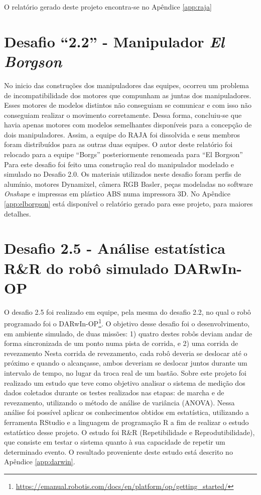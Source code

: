 O relatório gerado deste projeto encontra-se no Apêndice \ref{app:raja}


\section{Desafio ``2.2'' - Manipulador \textit{El Borgson}}

No inicio das construções dos manipuladores das equipes, ocorreu um problema de incompatibilidade dos motores que compunham as juntas dos manipuladores. Esses motores de modelos distintos não conseguiam se comunicar e com isso não conseguiam realizar o movimento corretamente. Dessa forma, concluiu-se que havia apenas motores com modelos semelhantes disponíveis para a concepção de dois manipuladores. Assim, a equipe do RAJA foi dissolvida e seus membros foram distribuídos para as outras duas equipes. O autor deste relatório foi relocado para a equipe ``Borgs'' posteriormente renomeada para ``El Borgson''
Para este desafio foi feito uma construção real do manipulador modelado e simulado
no Desafio 2.0. Os materiais utilizados neste desafio foram perfis de alumínio, motores Dynamixel, câmera RGB Basler, peças modeladas no software \textit{Onshape} e impressas em plástico ABS numa impressora 3D. No Apêndice \ref{app:elborgson} está disponível o relatório gerado para esse projeto, para maiores detalhes.


\section{Desafio 2.5 - Análise estatística R\&R do robô simulado DARwIn-OP}

O desafio 2.5 foi realizado em equipe, pela mesma do desafio 2.2, no qual o robô programado
foi o DARwIn-OP\footnote{\url{https://emanual.robotis.com/docs/en/platform/op/getting\_started/}}. O objetivo desse desafio foi o desenvolvimento, em ambiente
simulado, de duas missões: 1) quatro destes robôs deviam andar de forma sincronizada de um ponto numa pista de corrida, e 2) uma corrida de revezamento
Nesta corrida de revezamento, cada robô deveria se deslocar até o próximo e quando o alcançasse, ambos deveriam se deslocar juntos durante um intervalo de tempo, no lugar da troca real de um bastão.
Sobre este projeto foi realizado um estudo que teve como objetivo analisar o sistema
de medição dos dados coletados durante os testes realizados nas etapas: de marcha e
de revezamento, utilizando o método de análise de variância (ANOVA). Nessa análise
foi possível aplicar os conhecimentos obtidos em estatística, utilizando a ferramenta RStudio e a linguagem de programação R a fim de realizar o estudo estatístico desse projeto. O estudo foi R\&R (Repetibilidade e Reprodutibilidade), que consiste em testar o sistema quanto à sua capacidade de repetir um determinado evento.
O resultado proveniente deste estudo está descrito no Apêndice \ref{app:darwin}.


